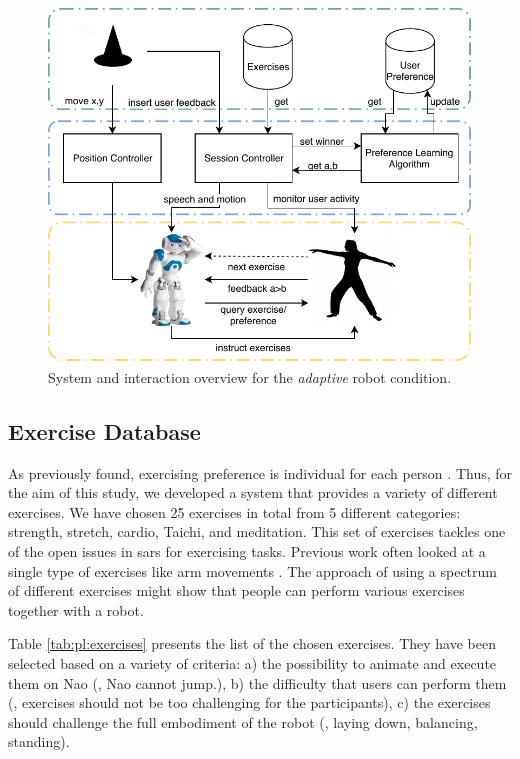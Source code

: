 \documentclass[twocolumn]{svjour3}          %
\begin{document}
\begin{figure}[h!]
\includegraphics[width=\columnwidth]{figures/figure-latex/systeminteraction.pdf}
\caption{System and interaction overview for the \textit{adaptive} robot condition.} \label{fig:system}
\end{figure}

\hypertarget{ecercise-database}{%
\subsection{Exercise Database}\label{ecercise-database}}

As previously found, exercising preference is individual for each person
\autocite{rhodes2006personality}. Thus, for the aim of this study, we
developed a system that provides a variety of different exercises. We
have chosen 25 exercises in total from 5 different categories: strength,
stretch, cardio, Taichi, and meditation. This set of exercises tackles
one of the open issues in \glspl{sar} for exercising tasks. Previous work often
looked at a single type of exercises like arm movements
\autocite{eriksson2005hands,fasola2013socially,guneysu2017}. The
approach of using a spectrum of different exercises might show that
people can perform various exercises together with a robot.

Table \ref{tab:pl:exercises} presents the list of the chosen exercises. They
have been selected based on a variety of criteria: a) the possibility to
animate and execute them on Nao (\ie{}, Nao cannot jump.), b) the
difficulty that users can perform them (\ie{}, exercises should not be
too challenging for the participants), c) the exercises should challenge
the full embodiment of the robot (\ie{}, laying down, balancing,
standing).
\end{document}
